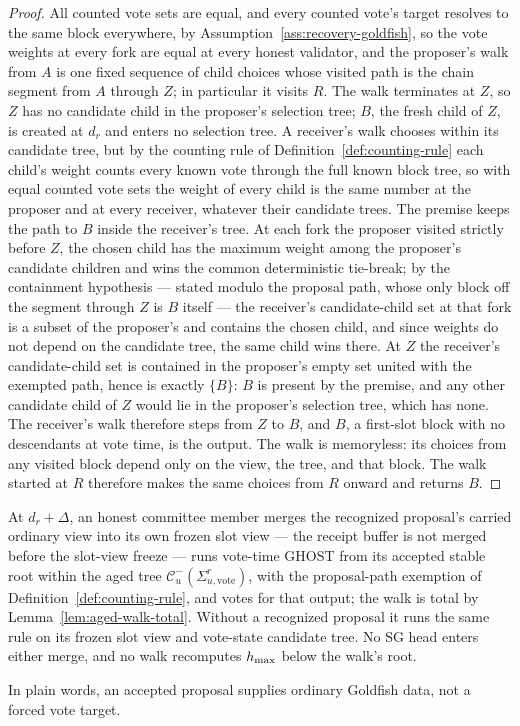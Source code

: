 \begin{proof}
All counted vote sets are equal, and every counted vote's target
resolves to the same block everywhere, by
Assumption~\ref{ass:recovery-goldfish}, so the vote weights at every fork
are equal at every honest validator, and the proposer's walk from \(A\)
is one fixed sequence of child choices whose visited path is the chain
segment from \(A\) through \(Z\); in particular it visits
\(R\).  The walk terminates at \(Z\), so \(Z\) has no candidate child
in the proposer's selection tree; \(B\), the fresh child of \(Z\), is
created at \(d_r\) and enters no selection tree.  A receiver's walk chooses within its candidate tree, but by the
counting rule of Definition~\ref{def:counting-rule} each child's
weight counts every known vote through the full known block tree, so
with equal counted vote sets the weight of every child is the same
number at the proposer and at every receiver, whatever their candidate
trees.  The premise keeps the path to \(B\) inside the receiver's tree.
At each fork the proposer visited strictly before \(Z\), the chosen
child has the maximum weight among the proposer's candidate children and
wins the common deterministic tie-break; by the containment hypothesis
--- stated modulo the proposal path, whose only block off the segment
through \(Z\) is \(B\) itself --- the receiver's candidate-child set at
that fork is a subset of the
proposer's and contains the chosen child, and since
weights do not depend on the candidate tree, the same child wins there.
At \(Z\) the receiver's candidate-child set is contained in the
proposer's empty set united with the exempted path, hence is exactly
\(\{B\}\): \(B\) is present by the premise, and any other candidate
child of \(Z\) would lie in the proposer's selection tree, which has
none.  The receiver's walk therefore steps from \(Z\) to \(B\), and
\(B\), a first-slot block with no descendants at vote time, is the
output.  The walk is memoryless: its choices from any
visited block depend only on the view, the tree, and that block.  The
walk started at \(R\) therefore makes the same
choices from \(R\) onward and returns \(B\).
\end{proof}

\begin{definition}\label{def:recovery-goldfish-vote}
At \(d_r+\Delta\), an honest committee member merges the recognized
proposal's carried ordinary view into its own frozen slot view --- the
receipt buffer is not merged before the slot-view freeze --- runs
vote-time GHOST from its accepted stable root within the aged tree
\(\mathcal C^{-}_u(\Sigma_{u,\mathrm{vote}}^r)\), with the
proposal-path exemption of Definition~\ref{def:counting-rule}, and
votes for that output; the walk is total by
Lemma~\ref{lem:aged-walk-total}.  Without
a recognized proposal it runs the same rule on its frozen slot view and
vote-state candidate tree.  No SG head enters either merge, and no walk
recomputes \(h_{\max}\) below the walk's root.

In plain words, an accepted proposal supplies ordinary Goldfish data, not a
forced vote target.
\end{definition}

